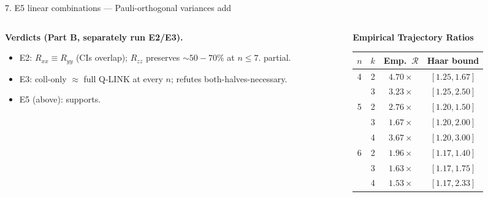 \documentclass[10pt, aspectratio=169]{beamer}
\begin{document}
\begin{frame}{7. E5 linear combinations — Pauli-orthogonal variances add}
\begin{columns}
\begin{column}{0.58\textwidth}
            \vspace{0.4em}
            \textbf{Verdicts (Part B, separately run E2/E3).}
            \begin{itemize}\tiny\itemsep 0.05em
                \item E2: $R_{xx} \equiv R_{yy}$ (CIs overlap); $R_{zz}$ preserves $\sim 50\!-\!70\%$ at $n \le 7$. \textcolor{pass}{partial}.
                \item E3: coll-only $\approx$ full Q-LINK at every $n$; \textcolor{miss}{refutes both-halves-necessary}.
                \item E5 (above): \textcolor{pass}{supports}.
            \end{itemize}
        \end{column}
        \begin{column}{0.42\textwidth}\centering\scriptsize
            \textbf{Empirical Trajectory Ratios}\\\vspace{0.3em}
            \begin{tabular}{cccc}\toprule
            $n$ & $k$ & Emp.\ $\mathcal{R}$ & Haar bound \\\midrule
            \multirow{2}{*}{4} & 2 & $4.70\times$ & $[1.25, 1.67]$ \\
                               & 3 & $3.23\times$ & $[1.25, 2.50]$ \\\midrule
            \multirow{3}{*}{5} & 2 & $2.76\times$ & $[1.20, 1.50]$ \\
                               & 3 & $1.67\times$ & $[1.20, 2.00]$ \\
                               & 4 & $3.67\times$ & $[1.20, 3.00]$ \\\midrule
            \multirow{3}{*}{6} & 2 & $1.96\times$ & $[1.17, 1.40]$ \\
                               & 3 & $1.63\times$ & $[1.17, 1.75]$ \\
                               & 4 & $1.53\times$ & $[1.17, 2.33]$ \\\bottomrule
            \end{tabular}
        \end{column}
    \end{columns}
\end{frame}
\end{document}
